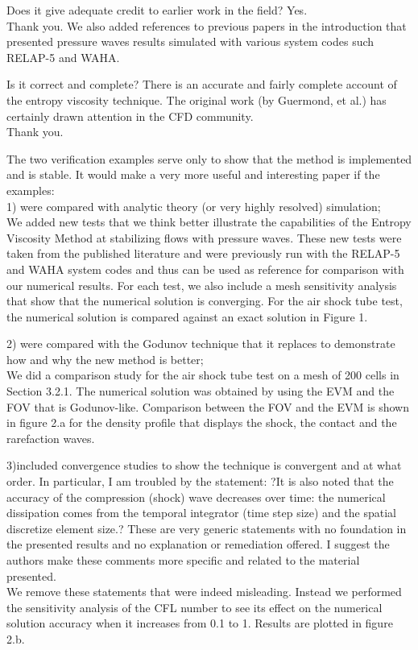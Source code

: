 \documentclass{article}
\begin{document}
\bigskip

{\color{blue}
Does it give adequate credit to earlier work in the field? Yes. \\
}
Thank you. We also added references to previous papers in the introduction that presented pressure waves results simulated with various system codes such RELAP-5 and WAHA.
\bigskip

{\color{blue}
Is it correct and complete?
There is an accurate and fairly complete account of the entropy viscosity technique. The original work (by Guermond, et al.) has certainly drawn attention in the CFD community.\\
}
Thank you.

\bigskip

{\color{blue}
The two verification examples serve only to show that the method is implemented and is stable. It would make a very more useful and interesting paper if the examples: \\
1) were compared with analytic theory (or very highly resolved) simulation; \\
}
We added new tests that we think better illustrate the capabilities of the Entropy Viscosity Method at stabilizing flows with pressure waves. These new tests were taken from the published literature and were previously run with the RELAP-5 and WAHA system codes and thus can be used as reference for comparison with our numerical results. For each test, we also include a mesh sensitivity analysis that show that the numerical solution is converging. For the air shock tube test, the numerical solution is compared against an exact solution in Figure 1.
\bigskip

{\color{blue}
2) were compared with the Godunov technique that it replaces to demonstrate how and why the new method is better; \\
}
We did a comparison study for the air shock tube test on a mesh of 200 cells in Section 3.2.1. The numerical solution was obtained by using the EVM and the FOV that is Godunov-like. Comparison between the FOV and the EVM is shown in figure 2.a for the density profile that displays the shock, the contact and the rarefaction waves.
\bigskip

{\color{blue}
3)included convergence studies to show the technique is convergent and at what order.
In particular, I am troubled by the statement: ?It is also noted that the accuracy of the compression (shock) wave decreases over time: the numerical dissipation comes from the temporal integrator (time step size) and the spatial discretize element size.? These are very generic statements with no foundation in the presented results and no explanation or remediation offered. I suggest the authors make these comments more specific and related to the material presented.
\\}
We remove these statements that were indeed misleading. Instead we performed the sensitivity analysis of the CFL number to see its effect on the numerical solution accuracy when it increases from 0.1 to 1. Results are plotted in figure 2.b. 
\bigskip
\end{document}
